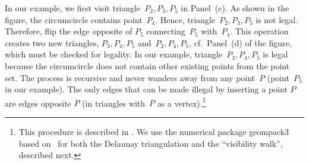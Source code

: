 \documentclass[a4paper,12pt]{article}%
\begin{document}
In our example, we first visit triangle~$P_{2},P_{3},P_{5}$ in Panel~(c). As shown in the figure, the circumcircle contains point~$P_{4}$. Hence, triangle~$P_{2},P_{3},P_{5}$ is not legal. Therefore, flip the edge opposite of $P_{5}$ connecting~$P_{5}$ with~$P_{4}$. This operation creates two new triangles, $P_{3},P_{4},P_{5}$ and~$P_{2},P_{4},P_{5}$, cf.~Panel~(d) of the figure, which must be checked for legality. In our example, triangle~$P_{3},P_{4},P_{5}$ is legal because the circumcircle does not contain other existing points from the point set. The process is recursive and never wanders away from any point~$P$ (point~$P_{5}$ in our example). The only edges that can be made illegal by inserting a point $P$ are edges opposite $P$ (in triangles with~$P$ as a vertex).\footnote{This procedure is described in . We use the numerical package geompack3 based on~ for both the Delaunay triangulation and the ``visibility walk'', described next.}
\end{document}
